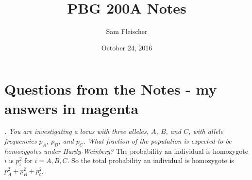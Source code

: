\documentclass{article}
\title{PBG 200A Notes}
\author{Sam Fleischer}
\date{October 24, 2016}
\begin{document}
    \maketitle

    \section{Questions from the Notes - my answers in {\color{magenta}magenta}}
        
        \emph{. You are investigating a locus with three alleles, $A$, $B$, and $C$, with allele frequencies $p_A$, $p_B$, and $p_C$. What fraction of the population is expected to be homozygotes under Hardy-Weinberg?}  {\color{magenta}The probability an individual is homozygote $i$ is $p_i^2$ for $i = A,B,C$.  So the total probability an individual is homozygote is $p_A^2 + p_B^2 + p_C^2$.} \\
\end{document}
